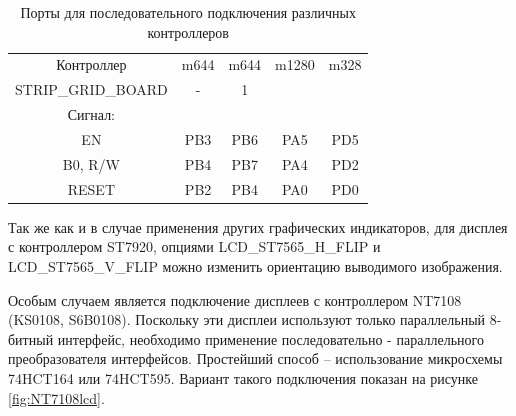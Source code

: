 \begin{table}[H]
  \begin{center}
    \begin{tabular}{| c || c | c | c | c |}
    \hline
 Контроллер  & m644  & m644 & m1280  & m328 \\
STRIP\_GRID\_BOARD &   -   &   1   &        &     \\
Сигнал:     &       &       &        &         \\
    \hline
    \hline
  EN        &  PB3  & PB6   &  PA5   & PD5     \\
    \hline
  B0, R/W   &  PB4  & PB7   &  PA4   & PD2      \\
    \hline
  RESET     &  PB2  & PB4   &  PA0   & PD0      \\
    \hline
    \end{tabular}
  \end{center}
  \caption{Порты для последовательного подключения различных контроллеров}
  \label{tab:ser-processor}
\end{table}

Так же как и в случае применения других графических индикаторов, для дисплея с контроллером ST7920,
опциями LCD\_ST7565\_H\_FLIP и LCD\_ST7565\_V\_FLIP можно изменить ориентацию выводимого изображения.

Особым случаем является подключение дисплеев с контроллером NT7108 (KS0108, S6B0108). Поскольку эти дисплеи 
используют только параллельный 8-битный интерфейс, необходимо применение последовательно - параллельного 
преобразователя интерфейсов. Простейший способ -- использование микросхемы 74HCT164 или 74HCT595.
Вариант такого подключения показан на рисунке \ref{fig:NT7108lcd}.

